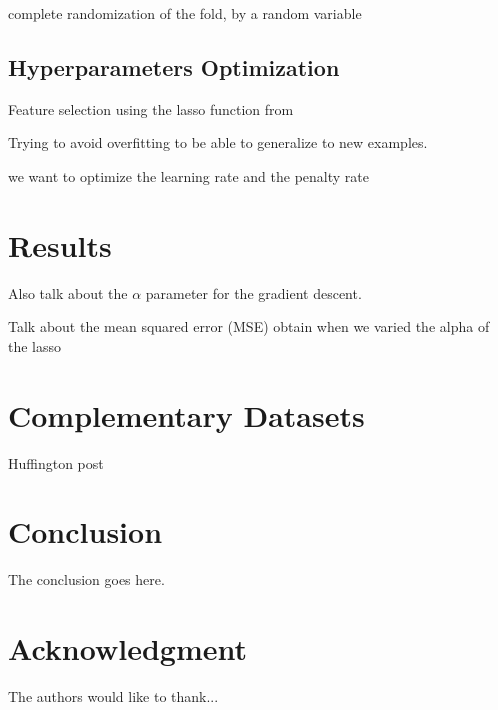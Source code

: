 \documentclass[conference]{IEEEtran}
\begin{document}
complete randomization of the fold, by a random variable

\subsection{Hyperparameters Optimization}

Feature selection using the lasso function from \cite{scikit-learn}

Trying to avoid overfitting to be able to generalize to new examples.

we want to optimize the learning rate and the penalty rate

\section{Results}


Also talk about the $\alpha$ parameter for the gradient descent.

Talk about the mean squared error (MSE) obtain when we varied the alpha of the lasso 

\section{Complementary Datasets}

Huffington post


\section{Conclusion}
The conclusion goes here.






\section*{Acknowledgment}


The authors would like to thank...






\end{document}
